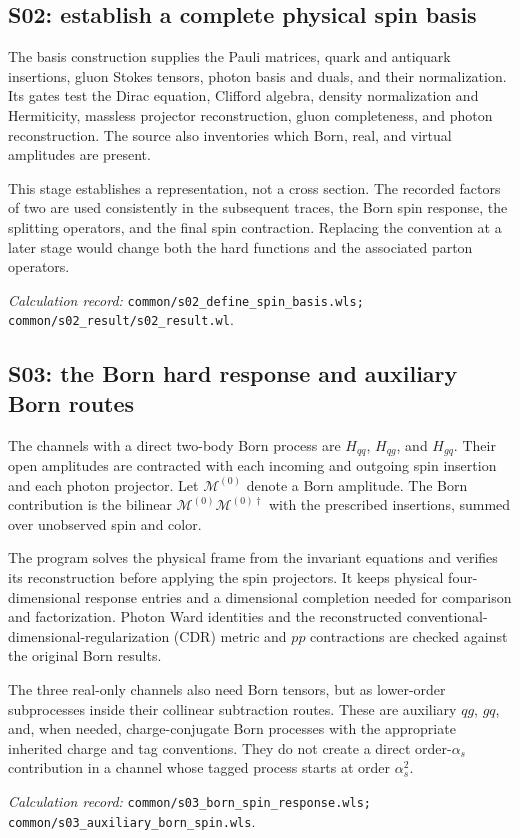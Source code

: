 \documentclass[11pt,a4paper]{article}
\newcommand{\as}{\alpha_s}
\newcommand{\code}[1]{{\small\nolinkurl{#1}}}
\newcommand{\pathref}[1]{\par{\footnotesize\textit{Calculation record:} \code{#1}.}\par}
\begin{document}
\subsection{S02: establish a complete physical spin basis}
The basis construction supplies the Pauli matrices, quark and antiquark insertions, gluon Stokes tensors, photon basis and duals, and their normalization. Its gates test the Dirac equation, Clifford algebra, density normalization and Hermiticity, massless projector reconstruction, gluon completeness, and photon reconstruction. The source also inventories which Born, real, and virtual amplitudes are present.

This stage establishes a representation, not a cross section. The recorded factors of two are used consistently in the subsequent traces, the Born spin response, the splitting operators, and the final spin contraction. Replacing the convention at a later stage would change both the hard functions and the associated parton operators.
\pathref{common/s02_define_spin_basis.wls; common/s02_result/s02_result.wl}

\subsection{S03: the Born hard response and auxiliary Born routes}
The channels with a direct two-body Born process are $H_{qq}$, $H_{qg}$, and $H_{gq}$. Their open amplitudes are contracted with each incoming and outgoing spin insertion and each photon projector. Let $\mathcal M^{(0)}$ denote a Born amplitude. The Born contribution is the bilinear $\mathcal M^{(0)}\mathcal M^{(0)\dagger}$ with the prescribed insertions, summed over unobserved spin and color.

The program solves the physical frame from the invariant equations and verifies its reconstruction before applying the spin projectors. It keeps physical four-dimensional response entries and a dimensional completion needed for comparison and factorization. Photon Ward identities and the reconstructed conventional-dimensional-regularization (CDR) metric and $pp$ contractions are checked against the original Born results.

The three real-only channels also need Born tensors, but as lower-order subprocesses inside their collinear subtraction routes. These are auxiliary $qg$, $gq$, and, when needed, charge-conjugate Born processes with the appropriate inherited charge and tag conventions. They do not create a direct order-$\as$ contribution in a channel whose tagged process starts at order $\as^2$.
\pathref{common/s03_born_spin_response.wls; common/s03_auxiliary_born_spin.wls}
\end{document}
